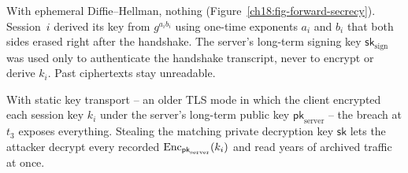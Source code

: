 With ephemeral Diffie--Hellman, nothing (Figure~\ref{ch18:fig-forward-secrecy}). Session~$i$ derived its key from $g^{a_i b_i}$ using one-time exponents $a_i$ and $b_i$ that both sides erased right after the handshake. The server's long-term signing key $\mathsf{sk}_{\mathrm{sign}}$ was used only to authenticate the handshake transcript, never to encrypt or derive $k_i$. Past ciphertexts stay unreadable.

With static key transport -- an older TLS mode in which the client encrypted each session key $k_i$ under the server's long-term public key $\mathsf{pk}_{\mathrm{server}}$ -- the breach at $t_3$ exposes everything. Stealing the matching private decryption key $\mathsf{sk}$ lets the attacker decrypt every recorded $\operatorname{Enc}_{\mathsf{pk}_{\mathrm{server}}}(k_i)$ and read years of archived traffic at once.

